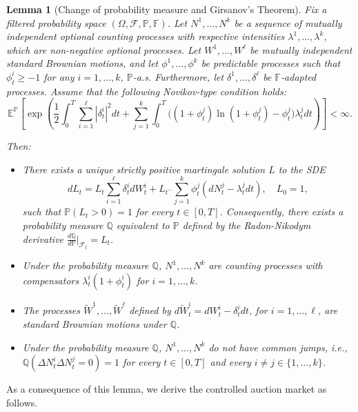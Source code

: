\documentclass[12pt]{article}
\newtheorem{lemma}[theorem2]{Lemma}
\begin{document}
\begin{lemma}[Change of probability measure and Girsanov's Theorem]\label{thm:girsanoc}
Fix a filtered probability space $(\Omega, \mathcal{F}, \mathbb{P}, \mathbb{F})$. Let $N^1, \dots, N^k$ be a sequence of mutually independent optional counting processes with respective intensities $\lambda^1, \dots, \lambda^k$, which are non-negative optional processes. Let $W^1, \dots, W^\ell$ be mutually independent standard Brownian motions, and let $\phi^1, \dots, \phi^k$ be predictable processes such that $\phi_t^i \geq -1$ for any $i = 1, \dots, k$, $\mathbb{P}$-a.s. Furthermore, let $\delta^1, \dots, \delta^\ell$ be $\mathbb{F}$-adapted processes. 
Assume that the following Novikov-type condition holds:
\begin{equation}\label{novikov}
    \mathbb{E}^\mathbb{P}\left[\exp\left(\frac{1}{2} \int_0^T \sum_{i=1}^\ell |\delta^i_t|^2 dt + \sum_{j=1}^k \int_0^T \Big((1+\phi_t^j)\ln(1+\phi_t^j) - \phi_t^j \Big)\lambda^j_t dt\right) \right] < \infty.
\end{equation}

Then:
\begin{itemize}
    \item[i.] There exists a unique strictly positive martingale solution $L$ to the SDE
    $$dL_t = L_t \sum_{i=1}^\ell \delta_t^i dW_t^i + L_{t^-} \sum_{j=1}^k \phi_t^j (dN_t^j - \lambda_t^j dt), \quad L_0 = 1,$$
    such that $\mathbb{P}(L_t > 0) = 1$ for every $t \in [0,T]$. Consequently, there exists a probability measure $\mathbb{Q}$ equivalent to $\mathbb{P}$ defined by the Radon-Nikodym derivative $\frac{d\mathbb{Q}}{d\mathbb{P}}\big|_{\mathcal{F}_t} = L_t$.
    \item[ii.] Under the probability measure $\mathbb{Q}$, $N^1, \dots, N^k$ are counting processes with compensators $\lambda_t^i(1+\phi^i_t)$ for $i = 1, \dots, k$.
    \item[iii.] The processes $\tilde{W}^1, \dots, \tilde{W}^\ell$ defined by $d\tilde{W}_t^i = dW_t^i - \delta_t^i dt$, for $i= 1, \dots, \ell$, are standard Brownian motions under $\mathbb{Q}$.
    \item[iv.] Under the probability measure $\mathbb{Q}$, $N^1, \dots, N^k$ do not have common jumps, i.e., $\mathbb{Q}(\Delta N_t^i \Delta N_t^j = 0) = 1$ for every $t \in [0,T]$ and every $i \ne j \in \{1, \dots, k\}$.
\end{itemize}
\end{lemma}
As a consequence of this lemma, we derive the controlled auction market as follows.
\end{document}
